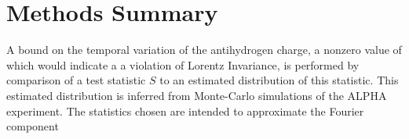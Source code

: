 \documentclass[superscriptaddress,aps,prb,11pt]{revtex4-1}
\begin{document}
\section{Methods Summary}
A bound on the temporal variation of the antihydrogen charge, a nonzero value of which would indicate a a violation of Lorentz Invariance, is performed by comparison of a test statistic $S$ to an estimated distribution of this statistic.  This estimated distribution is inferred from Monte-Carlo simulations of the ALPHA experiment.  The statistics chosen are intended to approximate the Fourier component

\begin{figure}
  \centering

\end{figure}
\end{document}

